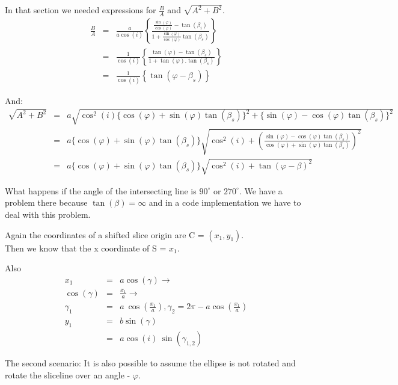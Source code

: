 \documentclass[11pt,a4paper]{article}
\newcommand{\sinb}[1]{\sin \left( #1 \right)}
\newcommand{\cosb}[1]{\cos \left( #1 \right)}
\newcommand{\cosbb}[1]{\cos^2 \left( #1 \right)}
\newcommand{\tanb}[1]{\tan \left( #1 \right)}
\begin{document}
In that section we needed expressions for $\frac{B}{A}$ and $\sqrt{A^2 + B^2}$.
\begin{eqnarray}
\frac{B}{A} & = & \frac{a}{a \cosb{i}} \left\{ \frac{\frac{\sinb{\varphi}}{\cosb{\varphi}} - \tanb{\beta_i}}
{1 + \frac{\sinb{\varphi}}{\cosb{\varphi}} \tanb{\beta_s}} \right\}\nonumber\\
 & = & \frac{1}{\cosb{i}} \left\{ \frac{\tanb{\varphi} - \tanb{\beta_s}}{1 + \tanb{\varphi}. \tanb{\beta_s}}\right\}\nonumber\\
 & = & \frac{1}{\cosb{i}} \left\{ \tanb{\varphi - \beta_s}\right\}
\end{eqnarray}

And:
\begin{eqnarray}
\sqrt{A^2 + B^2} &  = &  a \sqrt{ \cosbb{i} \{\cosb{\varphi} + \sinb{\varphi} \tanb{\beta_s} \}^2 + \{\sinb{\varphi} - \cosb{\varphi} \tanb{\beta_s} \}^2} \nonumber\\
& = & a \{ \cosb{\varphi} + \sinb{\varphi} \tanb{\beta_s} \} \sqrt{ \cosbb{i} + \left(\frac{\sinb{\varphi} - \cosb{\varphi} \tanb{\beta_s}}{\cosb{\varphi} + \sinb{\varphi} \tanb{\beta_s}}\right)^2}\nonumber\\
& = & a \{ \cosb{\varphi} + \sinb{\varphi} \tanb{\beta_s} \} \sqrt{ \cosbb{i} + \tanb{\varphi - \beta}^2}
\end{eqnarray}

What happens if the angle of the intersecting line is $90^{\circ}$ or $270^{\circ}$. 
We have a problem there because $\tanb{\beta} = \infty$ and in a code implementation we have
to deal with this problem.

Again the coordinates of a shifted slice origin are C = $(x_1, y_1)$.\\
Then we know that the x coordinate of S = $x_1$.

Also 
\begin{eqnarray}
x_1 & = & a \cosb{\gamma} \to \nonumber\\
\cosb{\gamma} & = & \frac{x_1}{a} \to \nonumber\\
\gamma_1 & = & a\ \cosb{\frac{x_1}{a}},  \gamma_2 = 2\pi - a \cosb{\frac{x_1}{a}} \nonumber\\
y_1 & = & b \sinb{\gamma} \nonumber\\
& = & a \cosb{i}\ \sinb{\gamma_{1,2}}
\end{eqnarray}
\pagebreak


The second scenario: It is also possible to assume the ellipse is not 
rotated and rotate the sliceline over an angle - $\varphi$.
\end{document}
